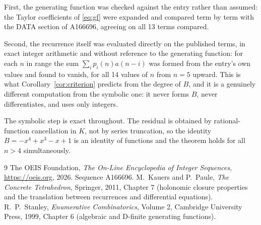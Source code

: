\documentclass[11pt,a4paper]{article}
\theoremstyle{plain}
\theoremstyle{definition}
\begin{document}
First, the generating function was checked against the entry rather than assumed: the
Taylor coefficients of \eqref{eq:gf} were expanded and compared term by term with the DATA
section of A166696, agreeing on all 13 terms compared.

Second, the recurrence itself was evaluated directly on the published terms, in exact
integer arithmetic and without reference to the generating function: for each $n$ in range
the sum $\sum_{i}p_{i}(n)a(n-i)$ was formed from the entry's own values and found to
vanish, for all 14 values of $n$ from $n=5$ upward. This is what
Corollary~\ref{cor:criterion} predicts from the degree of $B$, and it is a genuinely
different computation from the symbolic one: it never forms $B$, never differentiates, and
uses only integers.

The symbolic step is exact throughout. The residual is obtained by rational-function
cancellation in $K$, not by series truncation, so the identity $B=- x^{4} + x^{3} - x + 1$ is an
identity of functions and the theorem holds for all $n>4$ simultaneously.

\begin{thebibliography}{9}
 The OEIS Foundation, \emph{The On-Line Encyclopedia of Integer Sequences},
\url{https://oeis.org}, 2026. Sequence A166696.
 M.~Kauers and P.~Paule, \emph{The Concrete Tetrahedron}, Springer, 2011,
Chapter 7 (holonomic closure properties and the translation between recurrences and
differential equations).
 R.~P.~Stanley, \emph{Enumerative Combinatorics}, Volume 2, Cambridge
University Press, 1999, Chapter 6 (algebraic and D-finite generating functions).
\end{thebibliography}
\end{document}

